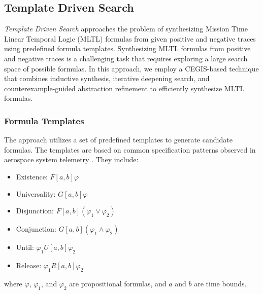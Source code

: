 \documentclass[runningheads]{llncs}
\renewcommand{\phi}{\varphi}
\begin{document}
\subsection{Template Driven Search}

\textit{Template Driven Search}	approaches the problem of synthesizing Mission Time Linear Temporal Logic (MLTL) formulas from given positive and negative traces using predefined formula templates. Synthesizing MLTL formulas from positive and negative traces is a challenging task that requires exploring a large search space of possible formulas. In this approach, we employ a CEGIS-based technique that combines inductive synthesis, iterative deepening search, and counterexample-guided abstraction refinement to efficiently synthesize MLTL formulas.

\subsubsection{Formula Templates}
The approach utilizes a set of predefined templates to generate candidate formulas. The templates are based on common specification patterns observed in aerospace system telemetry \cite{LJBHCLR22}. They include:

\begin{itemize}
    \item Existence: $F[a,b] \phi$
    \item Universality: $G[a,b] \phi$
    \item Disjunction: $F[a,b] (\phi_1 \lor \phi_2)$
    \item Conjunction: $G[a,b] (\phi_1 \land \phi_2)$
    \item Until: $\phi_1 U[a,b] \phi_2$
    \item Release: $\phi_1 R[a,b] \phi_2$
\end{itemize}

where $\phi$, $\phi_1$, and $\phi_2$ are propositional formulas, and $a$ and $b$ are time bounds.
\end{document}
